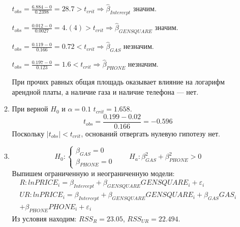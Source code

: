 \begin{enumerate}
\begin{enumerate}
$t_{obs} = \frac{6.884 - 0}{0.2398} = 28.7 > t_{crit} \Rightarrow \hat \beta_{Intercept}$ значим.

$t_{obs} = \frac{0.012 - 0}{0.0027} = 4.(4) > t_{crit} \Rightarrow \hat \beta_{GENSQUARE}$ значим.

$t_{obs} = \frac{0.119 - 0}{0.166} = 0.72 < t_{crit} \Rightarrow \hat \beta_{GAS}$ незначим.

$t_{obs} = \frac{0.197 - 0}{0.123} = 1.6 < t_{crit} \Rightarrow \hat \beta_{PHONE}$ незначим.

При прочих равных общая площадь оказывает влияние на логарифм арендной платы,
а наличие газа и наличие телефона — нет.
\item При верной $H_0$ и $\alpha = 0.1$ $t_{crit} = 1.658$.
\[
t_{obs} = \frac{0.199 - 0.02}{0.166} = -0.596
\]
Поскольку $|t_{obs}| < t_{crit}$, оснований отвергать нулевую гипотезу нет.
\item
\[H_0:
\begin{cases}
  \beta_{GAS} = 0 \\
  \beta_{PHONE} = 0
\end{cases}
\qquad
H_a: \beta_{GAS}^2 + \beta_{PHONE}^2 > 0
\]
Выпишем ограниченную и неограниченную модели:
\begin{multline*}
R: lnPRICE_i = \beta_{Intercept} + \beta_{GENSQUARE} GENSQUARE_i + \varepsilon_i \\
UR: lnPRICE_i = \beta_{Intercept} + \beta_{GENSQUARE} GENSQUARE_i + \beta_{GAS} GAS_i \\
+ \beta_{PHONE} PHONE_i + \varepsilon_i
\end{multline*}
Из условия находим: $RSS_{R} = 23.05$, $RSS_{UR} = 22.494$.


\end{enumerate}
\end{enumerate}

